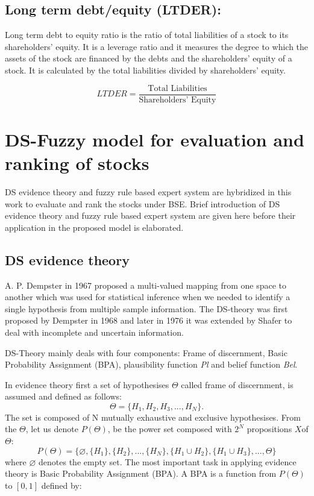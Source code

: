 \documentclass{elsarticle}
\begin{document}
\subsection{Long term debt/equity (LTDER):}
Long term debt to equity ratio is the ratio of total liabilities of a stock to its shareholders' equity. It is a 
leverage ratio and it measures the degree to which the assets of the stock are financed by the debts and the 
shareholders' equity of a stock.  It is calculated by the total liabilities divided by shareholders' equity.

\begin{equation}
LTDER=\frac{\textrm{Total Liabilities}}{\textrm{Shareholders' Equity}}
\end{equation}


\section{DS-Fuzzy model for evaluation and ranking of stocks}
DS evidence theory and fuzzy rule based expert system are hybridized in this work to evaluate and rank the stocks under BSE. Brief introduction of DS evidence theory and fuzzy rule based expert system are given here before their application in the proposed model is elaborated. 

\subsection{DS evidence theory}
A. P. Dempster in 1967 \cite{Dempster1967} proposed a multi-valued mapping from one space to another which was used for statistical inference when we needed to identify a single hypothesis from multiple sample information. The DS-theory was first proposed by Dempster in 1968 \cite{Dempster1968} and later in 1976 it was extended by Shafer \cite{Shafer1976} to deal with incomplete and uncertain information.

DS-Theory mainly deals with four components: Frame of discernment, Basic Probability Assignment (BPA), plausibility function \emph{Pl} and belief function \emph{Bel}. 

In evidence theory first a set of hypothesises $\Theta$ called frame of discernment, is assumed and defined as follows:
\begin{equation}
\Theta=\{H_1,H_2,H_3,...,H_N\}.
\end{equation} 
The set is composed of N mutually exhaustive and exclusive hypothesises. From the $\Theta$, let us denote $P(\Theta)$, be the power set composed with $2^N$ propositions $X$of $\Theta$:
\begin{equation}
P(\Theta)=\{\varnothing, \{H_1\}, \{H_2\},..., \{H_N\},\{H_1\cup H_2\}, \{H_1\cup H_3\},...,\Theta \}
\end{equation}  
where $\varnothing$ denotes the empty set. The most important task in applying evidence theory is Basic Probability Assignment (BPA). A BPA is a function from $P(\Theta)$ to $[0, 1]$ defined by:
\end{document}
